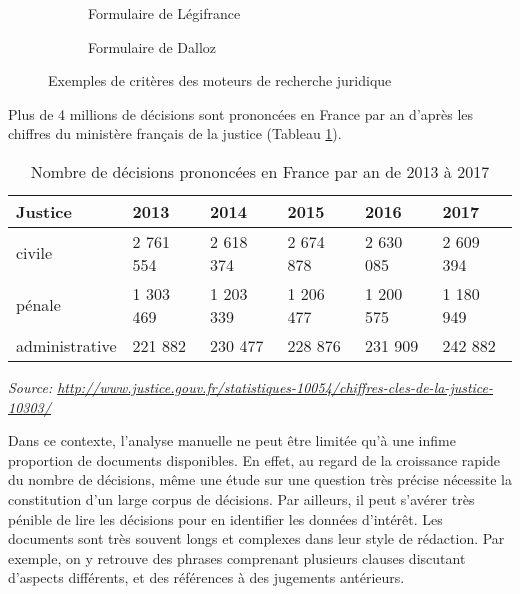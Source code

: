 \begin{figure}[!htb]
	\centering
	\begin{subfigure}[t]{0.8\textwidth}
		\centering
		\caption{Formulaire de Légifrance}
	\end{subfigure}%

	\begin{subfigure}[t]{0.46\textwidth}
		\centering
		\caption{Formulaire de Dalloz}
	\end{subfigure}
	\caption{Exemples de critères des moteurs de recherche juridique}\label{fig:intro:juriSearchForm}
\end{figure}

Plus de 4 millions de décisions sont prononcées en France par an d'après les chiffres du ministère français de la justice (Tableau \ref{tab:intro:nbdecisionstats}). 

\begin{table}[!htb]
 	\small
 	\begin{center}
 		\begin{tabular}{|l|l|l|l|l|l|}
 			\hline
 			\textbf{Justice}	& \textbf{2013}      & \textbf{2014}      & \textbf{2015}      & \textbf{2016}      & \textbf{2017}      \\ \hline
 			civile         & 2 761 554 & 2 618 374 & 2 674 878 & 2 630 085 & 2 609 394 \\ \hline
 			pénale         & 1 303 469 & 1 203 339 & 1 206 477 & 1 200 575 & 1 180 949 \\ \hline
 			administrative & 221 882   & 230 477   & 228 876   & 231 909   & 242 882   \\ \hline
 		\end{tabular}
 		
 		\textit{\scriptsize{Source: \url{http://www.justice.gouv.fr/statistiques-10054/chiffres-cles-de-la-justice-10303/}}}  
 	\end{center}
 	\caption{Nombre de décisions prononcées en France par an de 2013 à 2017}\label{tab:intro:nbdecisionstats}
 \end{table}
 
Dans ce contexte, l'analyse manuelle ne peut être limitée qu'à une infime proportion de documents disponibles.
En effet, au regard de la croissance rapide du nombre de décisions, même une étude sur une question très précise nécessite la constitution d'un large corpus de décisions. Par ailleurs, il peut s'avérer très pénible de lire les décisions pour en identifier les données d'intérêt. Les documents sont très souvent longs et complexes dans leur style de rédaction. Par exemple, on y retrouve des phrases comprenant plusieurs clauses discutant d'aspects différents, et des références à des jugements antérieurs.

